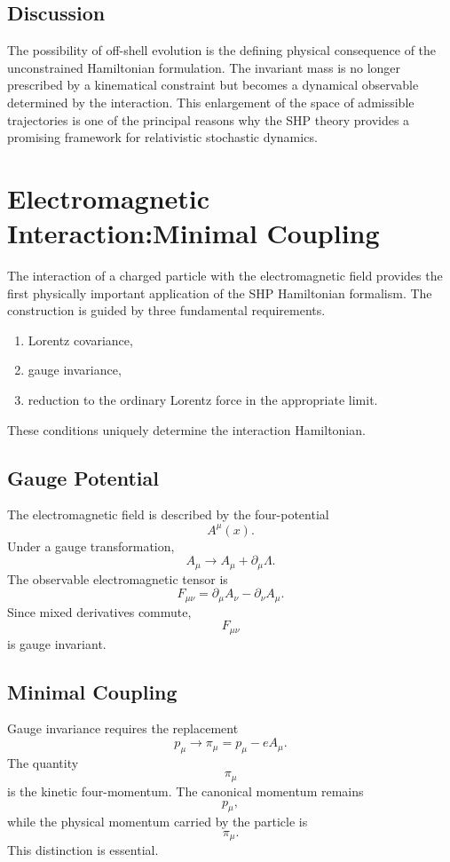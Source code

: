\subsection{Discussion}
The possibility of off-shell evolution is the defining physical
consequence of the unconstrained Hamiltonian formulation.
The invariant mass is no longer prescribed by a kinematical constraint
but becomes a dynamical observable determined by the interaction.
This enlargement of the space of admissible trajectories is one of the
principal reasons why the SHP theory provides a promising framework for
relativistic stochastic dynamics.
\section{Electromagnetic Interaction:Minimal Coupling}
The interaction of a charged particle with the electromagnetic field
provides the first physically important application of the SHP
Hamiltonian formalism.
The construction is guided by three fundamental requirements.
\begin{enumerate}
\item Lorentz covariance,
\item gauge invariance,
\item reduction to the ordinary Lorentz force in the appropriate limit.
\end{enumerate}
These conditions uniquely determine the interaction Hamiltonian.
\subsection{Gauge Potential}
The electromagnetic field is described by the four-potential
\[A^\mu(x).\]
Under a gauge transformation,
\[\boxed{A_\mu\rightarrow A_\mu+\partial_\mu\Lambda.}\]
The observable electromagnetic tensor is
\[\boxed{F_{\mu\nu}=\partial_\mu A_\nu-\partial_\nu A_\mu.}\]
Since mixed derivatives commute,
\[F_{\mu\nu}\]
is gauge invariant.
\subsection{Minimal Coupling}
Gauge invariance requires the replacement
\[\boxed{p_\mu\longrightarrow\pi_\mu=p_\mu-eA_\mu.}\]
The quantity
\[\pi_\mu\]
is the kinetic four-momentum.
The canonical momentum remains
\[p_\mu,\]
while the physical momentum carried by the particle is
\[\pi_\mu.\]
This distinction is essential.
